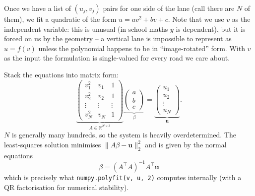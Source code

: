 Once we have a list of $(u_j, v_j)$ pairs for one side of the lane
(call there are $N$ of them), we fit a quadratic of the form
$u = a v^2 + b v + c$. Note that we use $v$ as the independent
variable: this is unusual (in school maths $y$ is dependent), but it
is forced on us by the geometry -- a vertical lane is impossible to
represent as $u = f(v)$ unless the polynomial happens to be in
``image-rotated'' form. With $v$ as the input the formulation is
single-valued for every road we care about.

Stack the equations into matrix form:
\[
\underbrace{\begin{pmatrix}
v_1^2 & v_1 & 1\\
v_2^2 & v_2 & 1\\
\vdots & \vdots & \vdots\\
v_N^2 & v_N & 1
\end{pmatrix}}_{A\in\mathbb{R}^{N\times 3}}
\underbrace{\begin{pmatrix}a\\b\\c\end{pmatrix}}_{\beta}
=
\underbrace{\begin{pmatrix}u_1\\u_2\\\vdots\\u_N\end{pmatrix}}_{\mathbf u}.
\]
$N$ is generally many hundreds, so the system is heavily
overdetermined. The least-squares solution minimises
$\|A\beta-\mathbf u\|_2^2$ and is given by the normal equations
\[
\beta = (A^\top A)^{-1}A^\top \mathbf u
\]
which is precisely what \texttt{numpy.polyfit(v, u, 2)} computes
internally (with a QR factorisation for numerical stability).

